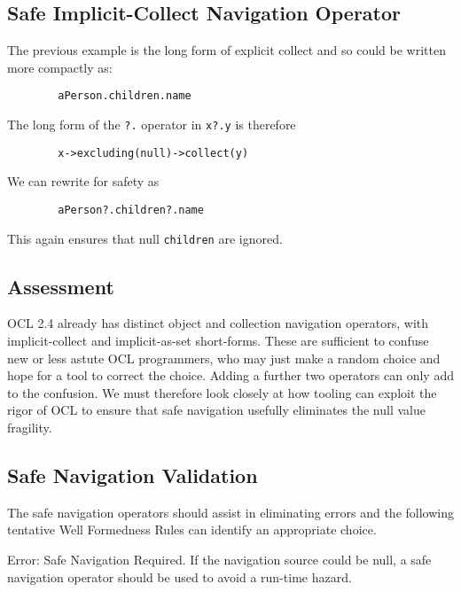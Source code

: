 \documentclass{llncs}
\begin{document}
\subsection{Safe Implicit-Collect Navigation Operator}

The previous example is the long form of explicit collect and so could be written more compactly as: 

\begin{verbatim}
        aPerson.children.name
\end{verbatim}

The long form of the \verb|?.| operator in  \verb|x?.y| is therefore

\begin{verbatim}
        x->excluding(null)->collect(y)
\end{verbatim}

We can rewrite for safety as

\begin{verbatim}
        aPerson?.children?.name
\end{verbatim}

This again ensures that null \verb|children| are ignored.

\subsection{Assessment}

OCL 2.4 already has distinct object and collection navigation operators, with implicit-collect and implicit-as-set short-forms. These are sufficient to confuse new or less astute OCL programmers, who may just make a random choice and hope for a tool to correct the choice. Adding a further two operators can only add to the confusion. We must therefore look closely at how tooling can exploit the rigor of OCL to ensure that safe navigation usefully eliminates the null value fragility.

\subsection{Safe Navigation Validation}

The safe navigation operators should assist in eliminating errors and the following tentative Well Formedness Rules can identify an appropriate choice.

Error: Safe Navigation Required. If the navigation source could be null, a safe navigation operator should be used to avoid a run-time hazard.
\end{document}
